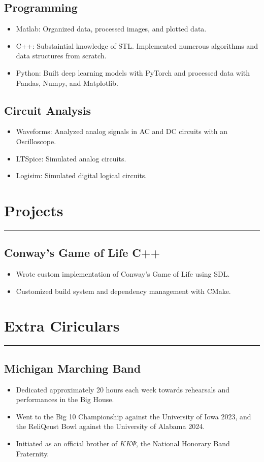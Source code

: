 \documentclass[10pt, letterpaper]{article}
\begin{document}
\subsection*{Programming}
\begin{itemize}[noitemsep]
	\item Matlab: Organized data, processed images, and plotted data.
	\item C++: Substaintial knowledge of STL. Implemented numerous algorithms and data structures from scratch.
	\item Python: Built deep learning models with PyTorch and processed data with Pandas, Numpy, and Matplotlib.
\end{itemize}

\subsection*{Circuit Analysis}
\begin{itemize}[noitemsep]
	\item Waveforms: Analyzed analog signals in AC and DC circuits with an Oscilloscope.	
	\item LTSpice: Simulated analog circuits.
	\item Logisim: Simulated digital logical circuits.
\end{itemize}

\section*{Projects}
\hrule
\vspace{7pt}

\subsection*{Conway's Game of Life \text{\text{|}} C++}
\begin{itemize}[noitemsep]
	\item Wrote custom implementation of Conway's Game of Life using SDL.
	\item Customized build system and dependency management with CMake.
\end{itemize}

\section*{Extra Ciriculars}
\hrule
\vspace{7pt}

\subsection*{Michigan Marching Band}
\begin{itemize}[noitemsep]
	\item Dedicated approximately 20 hours each week towards rehearsals and performances in the Big House.
	\item Went to the Big 10 Championship against the University of Iowa 2023,
		and the ReliQeust Bowl against the University of Alabama 2024.
	\item Initiated as an official brother of $K K\Psi$, the National Honorary Band Fraternity.
\end{itemize}
\end{document}

